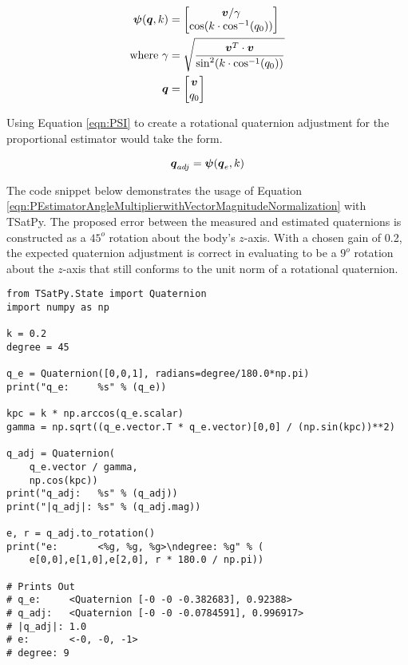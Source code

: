 \begin{equation}
  \begin{aligned}
    \boldsymbol{\psi}(\boldsymbol{q}, k) &= \begin{bmatrix} \boldsymbol{v} / \gamma \\ \cos ( k \cdot \cos^{-1} (q_0))  \end{bmatrix} \\
    \text{where } \gamma &= \sqrt{\frac{\boldsymbol{v}^T \cdot \boldsymbol{v}}{\sin^2 ( k \cdot \cos^{-1} (q_0))}} \\
    \boldsymbol{q} &= \begin{bmatrix} \boldsymbol{v} \\ q_0  \end{bmatrix}
  \end{aligned}
  \label{eqn:PSI}
\end{equation}

Using Equation \ref{eqn:PSI} to create a rotational quaternion adjustment for the proportional estimator would take the form.

\begin{equation}
  \boldsymbol{q}_{adj} = \boldsymbol{\psi}(\boldsymbol{q}_e, k)
  \label{eqn:PEstimatorAngleMultiplierwithVectorMagnitudeNormalization}
\end{equation}

The code snippet below demonstrates the usage of Equation \ref{eqn:PEstimatorAngleMultiplierwithVectorMagnitudeNormalization} with TSatPy.  The proposed error between the measured and estimated quaternions is constructed as a $45^o$ rotation about the body's $z$-axis.  With a chosen gain of 0.2, the expected quaternion adjustment is correct in evaluating to be a $9^o$ rotation about the $z$-axis that still conforms to the unit norm of a rotational quaternion.

\begin{singlespace}
  \begin{verbatim}
from TSatPy.State import Quaternion
import numpy as np

k = 0.2
degree = 45

q_e = Quaternion([0,0,1], radians=degree/180.0*np.pi)
print("q_e:     %s" % (q_e))

kpc = k * np.arccos(q_e.scalar)
gamma = np.sqrt((q_e.vector.T * q_e.vector)[0,0] / (np.sin(kpc))**2)

q_adj = Quaternion(
    q_e.vector / gamma,
    np.cos(kpc))
print("q_adj:   %s" % (q_adj))
print("|q_adj|: %s" % (q_adj.mag))

e, r = q_adj.to_rotation()
print("e:       <%g, %g, %g>\ndegree: %g" % (
    e[0,0],e[1,0],e[2,0], r * 180.0 / np.pi))

# Prints Out
# q_e:     <Quaternion [-0 -0 -0.382683], 0.92388>
# q_adj:   <Quaternion [-0 -0 -0.0784591], 0.996917>
# |q_adj|: 1.0
# e:       <-0, -0, -1>
# degree: 9
  \end{verbatim}
\nocite{minted}
\end{singlespace}

